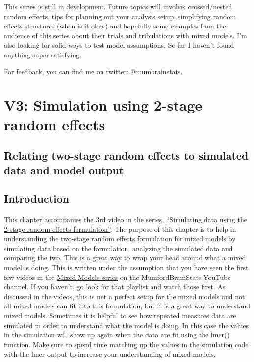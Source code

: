 \documentclass[
]{book}
\begin{document}
This series is still in development. Future topics will involve: crossed/nested random effects, tips for planning out your analysis setup, simplifying random effects structures (when is it okay) and hopefully some examples from the audience of this series about their trials and tribulations with mixed models. I'm also looking for solid ways to test model assumptions. So far I haven't found anything super satisfying.

For feedback, you can find me on twitter: @mumbrainstats.

\hypertarget{v3-simulation-using-2-stage-random-effects}{%
\chapter{V3: Simulation using 2-stage random effects}\label{v3-simulation-using-2-stage-random-effects}}

\hypertarget{relating-two-stage-random-effects-to-simulated-data-and-model-output}{%
\section{Relating two-stage random effects to simulated data and model output}\label{relating-two-stage-random-effects-to-simulated-data-and-model-output}}

\hypertarget{introduction-1}{%
\section{Introduction}\label{introduction-1}}

This chapter accompanies the 3rd video in the series, \href{https://youtu.be/OL6UezgpmPo}{``Simulating data using the 2-stage random effects formulation''}. The purpose of this chapter is to help in understanding the two-stage random effects formulation for mixed models by simulating data based on the formulation, analyzing the simulated data and comparing the two. This is a great way to wrap your head around what a mixed model is doing. This is written under the assumption that you have seen the first few videos in the \href{https://www.youtube.com/watch?v=IGHm1XHFWMc\&list=PLB2iAtgpI4YEAUiEQ1ZnfMXY-yewNzn9z}{Mixed Models series} on the MumfordBrainStats YouTube channel. If you haven't, go look for that playlist and watch those first. As discussed in the videos, this is not a perfect setup for the mixed models and not all mixed models can fit into this formulation, but it is a great way to understand mixed models. Sometimes it is helpful to see how repeated measures data are simulated in order to understand what the model is doing. In this case the values in the simulation will show up again when the data are fit using the lmer() function. Make sure to spend time matching up the values in the simulation code with the lmer output to increase your understanding of mixed models.
\end{document}
